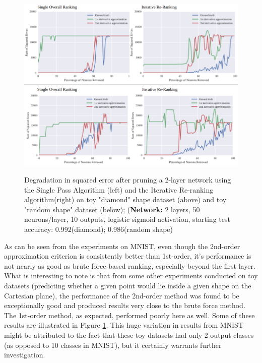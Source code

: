 \begin{figure}[!hb]
\centering
\includegraphics[width=0.80\linewidth]{png/diamond.png}
\includegraphics[width=0.80\linewidth]{png/rshape.png}
\caption{Degradation in squared error after pruning a 2-layer network using the Single Pass Algorithm (left) and the Iterative Re-ranking algorithm(right) on toy "diamond" shape dataset (above) and toy "random shape" dataset (below); (\textbf{Network:} 2 layers, 50 neurons/layer, 10 outputs, logistic sigmoid activation, starting test accuracy: 0.992(diamond); 0.986(random shape)}
\label{fig:diamond}
\end{figure}


As can be seen from the experiments on MNIST, even though the 2nd-order approximation criterion is consistently better than 1st-order, it's performance is not nearly as good as brute force based ranking, especially beyond the first layer. What is interesting to note is that from some other experiments conducted on toy datasets (predicting whether a given point would lie inside a given shape on the Cartesian plane), the performance of the 2nd-order method was found to be exceptionally good and produced results very close to the brute force method. The 1st-order method, as expected, performed poorly here as well. Some of these results are illustrated in Figure \ref{fig:diamond}. This huge variation in results from MNIST might be attributed to the fact that these toy datasets had only 2 output classes (as opposed to 10 classes in MNIST), but it certainly warrants further investigation.



